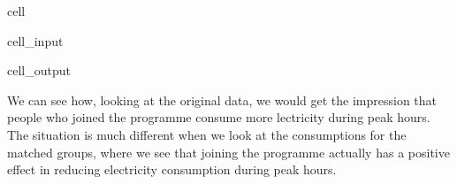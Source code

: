\documentclass[letterpaper,10pt,english]{jupyterBook}
\begin{document}
\begin{sphinxuseclass}{cell}\begin{sphinxVerbatimInput}

\begin{sphinxuseclass}{cell_input}
\begin{sphinxVerbatim}[commandchars=\\\{\}]
 
     
\end{sphinxVerbatim}

\end{sphinxuseclass}\end{sphinxVerbatimInput}
\begin{sphinxVerbatimOutput}

\begin{sphinxuseclass}{cell_output}
\noindent{}

\end{sphinxuseclass}\end{sphinxVerbatimOutput}

\end{sphinxuseclass}
\sphinxAtStartPar
We can see how, looking at the original data, we would get the impression that people who joined the programme consume more lectricity during peak hours. The situation is much different when we look at the consumptions for the matched groups, where we see that joining the programme actually has a positive effect in reducing electricity consumption during peak hours.
\end{document}
